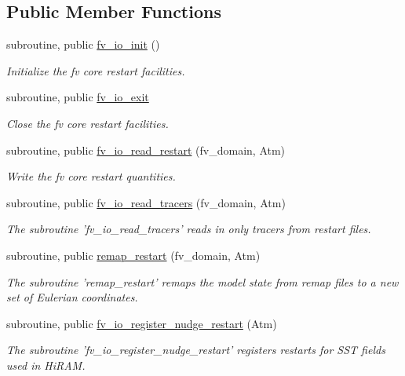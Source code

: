 \subsection*{Public Member Functions}
\begin{DoxyCompactItemize}
\item 
subroutine, public \hyperlink{classfv__io__mod_a374b943fdac1307ea36c3a38178f41fc}{fv\-\_\-io\-\_\-init} ()
\begin{DoxyCompactList}\small\item\em Initialize the fv core restart facilities. \end{DoxyCompactList}\item 
subroutine, public \hyperlink{classfv__io__mod_a71aae4a8b1c8c1f9a6392d4de3b6bd43}{fv\-\_\-io\-\_\-exit}
\begin{DoxyCompactList}\small\item\em Close the fv core restart facilities. \end{DoxyCompactList}\item 
subroutine, public \hyperlink{classfv__io__mod_ab67e5d4a465de71184f1247b34d5fdd8}{fv\-\_\-io\-\_\-read\-\_\-restart} (fv\-\_\-domain, Atm)
\begin{DoxyCompactList}\small\item\em Write the fv core restart quantities. \end{DoxyCompactList}\item 
subroutine, public \hyperlink{classfv__io__mod_a41fce9f83c0ca9c4f6bfb0357923737c}{fv\-\_\-io\-\_\-read\-\_\-tracers} (fv\-\_\-domain, Atm)
\begin{DoxyCompactList}\small\item\em The subroutine 'fv\-\_\-io\-\_\-read\-\_\-tracers' reads in only tracers from restart files. \end{DoxyCompactList}\item 
subroutine, public \hyperlink{classfv__io__mod_a161881a2b85c2bbebc41477e142861f5}{remap\-\_\-restart} (fv\-\_\-domain, Atm)
\begin{DoxyCompactList}\small\item\em The subroutine 'remap\-\_\-restart' remaps the model state from remap files to a new set of Eulerian coordinates. \end{DoxyCompactList}\item 
subroutine, public \hyperlink{classfv__io__mod_a31e5192f8a0fb55ed1984a9b02554652}{fv\-\_\-io\-\_\-register\-\_\-nudge\-\_\-restart} (Atm)
\begin{DoxyCompactList}\small\item\em The subroutine 'fv\-\_\-io\-\_\-register\-\_\-nudge\-\_\-restart' registers restarts for S\-S\-T fields used in Hi\-R\-A\-M. \end{DoxyCompactList}\item 

\end{DoxyCompactItemize}
